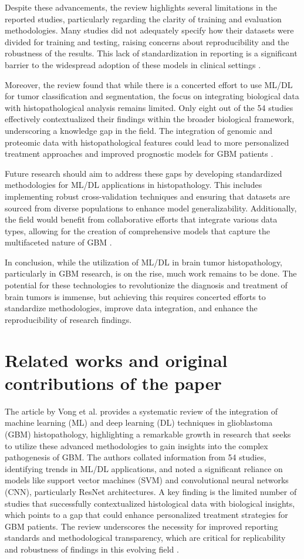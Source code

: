 \documentclass[runningheads]{llncs}
\begin{document}
Despite these advancements, the review highlights several limitations in the reported studies, particularly regarding the clarity of training and evaluation methodologies. Many studies did not adequately specify how their datasets were divided for training and testing, raising concerns about reproducibility and the robustness of the results. This lack of standardization in reporting is a significant barrier to the widespread adoption of these models in clinical settings \cite{Chun_2025}.

Moreover, the review found that while there is a concerted effort to use ML/DL for tumor classification and segmentation, the focus on integrating biological data with histopathological analysis remains limited. Only eight out of the 54 studies effectively contextualized their findings within the broader biological framework, underscoring a knowledge gap in the field. The integration of genomic and proteomic data with histopathological features could lead to more personalized treatment approaches and improved prognostic models for GBM patients \cite{Chun_2025}.

Future research should aim to address these gaps by developing standardized methodologies for ML/DL applications in histopathology. This includes implementing robust cross-validation techniques and ensuring that datasets are sourced from diverse populations to enhance model generalizability. Additionally, the field would benefit from collaborative efforts that integrate various data types, allowing for the creation of comprehensive models that capture the multifaceted nature of GBM \cite{Chun_2025}.

In conclusion, while the utilization of ML/DL in brain tumor histopathology, particularly in GBM research, is on the rise, much work remains to be done. The potential for these technologies to revolutionize the diagnosis and treatment of brain tumors is immense, but achieving this requires concerted efforts to standardize methodologies, improve data integration, and enhance the reproducibility of research findings.
\section{Related works and original contributions of the paper}
The article by Vong et al. provides a systematic review of the integration of machine learning (ML) and deep learning (DL) techniques in glioblastoma (GBM) histopathology, highlighting a remarkable growth in research that seeks to utilize these advanced methodologies to gain insights into the complex pathogenesis of GBM. The authors collated information from 54 studies, identifying trends in ML/DL applications, and noted a significant reliance on models like support vector machines (SVM) and convolutional neural networks (CNN), particularly ResNet architectures. A key finding is the limited number of studies that successfully contextualized histological data with biological insights, which points to a gap that could enhance personalized treatment strategies for GBM patients. The review underscores the necessity for improved reporting standards and methodological transparency, which are critical for replicability and robustness of findings in this evolving field \cite{Chun_2025}.
\end{document}
